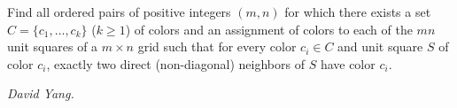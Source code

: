 Find all ordered pairs of positive integers $(m,n)$ for which there exists a set $C=\{c_1,\ldots,c_k\}$ ($k\ge1$) of colors and an assignment of colors to each of the $mn$ unit squares of a $m\times n$ grid such that for every color $c_i\in C$ and unit square $S$ of color $c_i$, exactly two direct (non-diagonal) neighbors of $S$ have color $c_i$.

\textit{David Yang.}